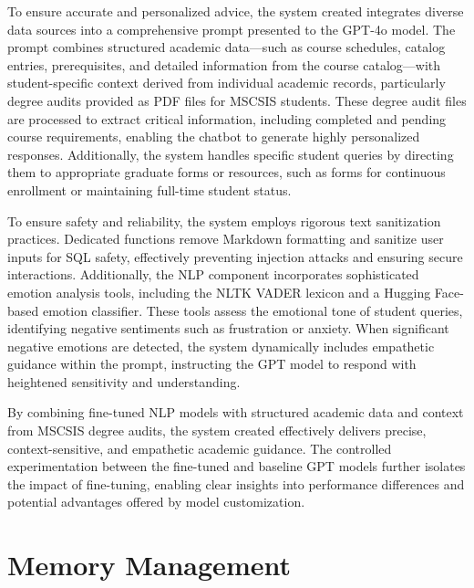 \documentclass[12pt,oneside,openany]{report}
\begin{document}
To ensure accurate and personalized advice, the system created integrates diverse data sources into a comprehensive prompt presented to the GPT-4o model. The prompt combines structured academic data—such as course schedules, catalog entries, prerequisites, and detailed information from the course catalog—with student-specific context derived from individual academic records, particularly degree audits provided as PDF files for MSCSIS students. These degree audit files are processed to extract critical information, including completed and pending course requirements, enabling the chatbot to generate highly personalized responses. Additionally, the system handles specific student queries by directing them to appropriate graduate forms or resources, such as forms for continuous enrollment or maintaining full-time student status.

To ensure safety and reliability, the system employs rigorous text sanitization practices. Dedicated functions remove Markdown formatting and sanitize user inputs for SQL safety, effectively preventing injection attacks and ensuring secure interactions. Additionally, the NLP component incorporates sophisticated emotion analysis tools, including the NLTK VADER lexicon and a Hugging Face-based emotion classifier. These tools assess the emotional tone of student queries, identifying negative sentiments such as frustration or anxiety. When significant negative emotions are detected, the system dynamically includes empathetic guidance within the prompt, instructing the GPT model to respond with heightened sensitivity and understanding.

By combining fine-tuned NLP models with structured academic data and context from MSCSIS degree audits, the system created effectively delivers precise, context-sensitive, and empathetic academic guidance. The controlled experimentation between the fine-tuned and baseline GPT models further isolates the impact of fine-tuning, enabling clear insights into performance differences and potential advantages offered by model customization.


\section{Memory Management} 
\end{document}
